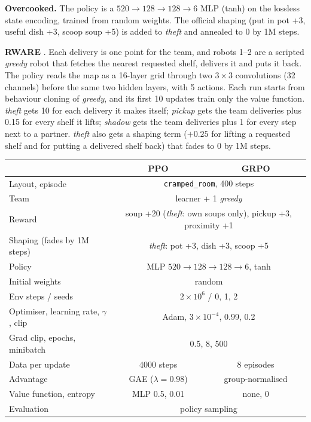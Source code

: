 \documentclass[letterpaper]{article} %
\begin{document}
\textbf{Overcooked.} The policy is a $520 \rightarrow 128 \rightarrow 128 \rightarrow 6$ MLP (tanh) on the lossless
state encoding, trained from random weights. The official shaping (put in pot +3, useful dish +3, scoop soup +5) is
added to \emph{theft} and annealed to 0 by 1M steps.

\textbf{RWARE} \cite{christianos2020seac}. Each delivery is one point for the team, and robots 1--2 are a scripted
\emph{greedy} robot that fetches the nearest requested shelf, delivers it and puts it back. The policy reads the map
as a 16-layer grid through two $3\times3$ convolutions (32 channels) before the same two hidden layers, with 5
actions. Each run starts from behaviour cloning of \emph{greedy}, and its first 10 updates train only the value
function. \emph{theft} gets 10 for each delivery it makes itself; \emph{pickup} gets the team deliveries plus 0.15
for every shelf it lifts; \emph{shadow} gets the team deliveries plus 1 for every step next to a partner.
\emph{theft} also gets a shaping term ($+0.25$ for lifting a requested
shelf and for putting a delivered shelf back) that fades to 0 by 1M steps.

\par\medskip\noindent\begin{minipage}{\textwidth}
\centering
\footnotesize
\setlength{\tabcolsep}{4pt}
\begin{tabular}{@{}lcc@{}}
\toprule
 & PPO & GRPO \\
\midrule
Layout, episode & \multicolumn{2}{c}{\texttt{cramped\_room}, 400 steps} \\
Team & \multicolumn{2}{c}{learner + 1 \emph{greedy}} \\
Reward & \multicolumn{2}{c}{soup +20 (\emph{theft}: own soups only), pickup +3, proximity +1} \\
Shaping (fades by 1M steps) & \multicolumn{2}{c}{\emph{theft}: pot +3, dish +3, scoop +5} \\
Policy & \multicolumn{2}{c}{MLP $520\rightarrow128\rightarrow128\rightarrow6$, tanh} \\
Initial weights & \multicolumn{2}{c}{random} \\
Env steps / seeds & \multicolumn{2}{c}{$2\times10^6$ / 0, 1, 2} \\
Optimiser, learning rate, $\gamma$, clip & \multicolumn{2}{c}{Adam, $3\times10^{-4}$, 0.99, 0.2} \\
Grad clip, epochs, minibatch & \multicolumn{2}{c}{0.5, 8, 500} \\
Data per update & 4000 steps & 8 episodes \\
Advantage & GAE ($\lambda=0.98$) & group-normalised \\
Value function, entropy & MLP 0.5, 0.01 & none, 0 \\
Evaluation & \multicolumn{2}{c}{policy sampling} \\
\bottomrule
\end{tabular}
\label{tab:hparams}
\end{minipage}\par\medskip
\end{document}
